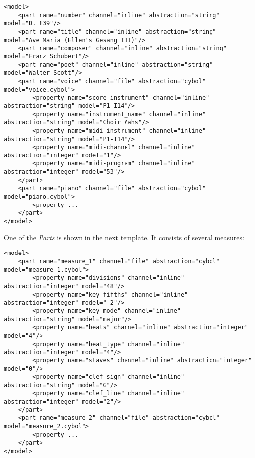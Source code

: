\begin{scriptsize}
    \begin{verbatim}
<model>
    <part name="number" channel="inline" abstraction="string" model="D. 839"/>
    <part name="title" channel="inline" abstraction="string" model="Ave Maria (Ellen's Gesang III)"/>
    <part name="composer" channel="inline" abstraction="string" model="Franz Schubert"/>
    <part name="poet" channel="inline" abstraction="string" model="Walter Scott"/>
    <part name="voice" channel="file" abstraction="cybol" model="voice.cybol">
        <property name="score_instrument" channel="inline" abstraction="string" model="P1-I14"/>
        <property name="instrument_name" channel="inline" abstraction="string" model="Choir Aahs"/>
        <property name="midi_instrument" channel="inline" abstraction="string" model="P1-I14"/>
        <property name="midi-channel" channel="inline" abstraction="integer" model="1"/>
        <property name="midi-program" channel="inline" abstraction="integer" model="53"/>
    </part>
    <part name="piano" channel="file" abstraction="cybol" model="piano.cybol">
        <property ...
    </part>
</model>
    \end{verbatim}
\end{scriptsize}

One of the \emph{Parts} is shown in the next template. It consists of several measures:

\newpage

\begin{scriptsize}
    \begin{verbatim}
<model>
    <part name="measure_1" channel="file" abstraction="cybol" model="measure_1.cybol">
        <property name="divisions" channel="inline" abstraction="integer" model="48"/>
        <property name="key_fifths" channel="inline" abstraction="integer" model="-2"/>
        <property name="key_mode" channel="inline" abstraction="string" model="major"/>
        <property name="beats" channel="inline" abstraction="integer" model="4"/>
        <property name="beat_type" channel="inline" abstraction="integer" model="4"/>
        <property name="staves" channel="inline" abstraction="integer" model="0"/>
        <property name="clef_sign" channel="inline" abstraction="string" model="G"/>
        <property name="clef_line" channel="inline" abstraction="integer" model="2"/>
    </part>
    <part name="measure_2" channel="file" abstraction="cybol" model="measure_2.cybol">
        <property ...
    </part>
</model>
    \end{verbatim}
\end{scriptsize}


